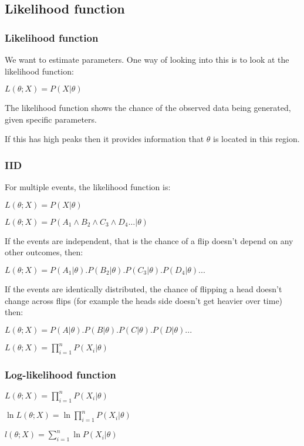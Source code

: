 
\subsection{Likelihood function}

\subsubsection{Likelihood function}

We want to estimate parameters. One way of looking into this is to look at the likelihood function:

\(L(\theta ; X)=P(X|\theta )\)

The likelihood function shows the chance of the observed data being generated, given specific parameters.

If this has high peaks then it provides information that \(\theta \) is located in this region.

\subsubsection{IID}

For multiple events, the likelihood function is:

\(L(\theta ; X)=P(X|\theta )\)

\(L(\theta ; X)=P(A_1 \land B_2 \land C_3 \land D_4…|\theta )\)

If the events are independent, that is the chance of a flip doesn’t depend on any other outcomes, then:

\(L(\theta ; X)=P(A_1|\theta ).P(B_2|\theta ).P(C_3|\theta ).P(D_4|\theta )...\)

If the events are identically distributed, the chance of flipping a head doesn’t change across flips (for example the heads side doesn’t get heavier over time) then:

\(L(\theta ; X)=P(A|\theta ).P(B|\theta ).P(C|\theta ).P(D|\theta )...\)

\(L(\theta ; X)=\prod_{i=1}^n P(X_i|\theta )\)

\subsubsection{Log-likelihood function}

\(L(\theta ; X)=\prod_{i=1}^n P(X_i|\theta )\)

\(\ln L(\theta ; X)=\ln \prod_{i=1}^n P(X_i|\theta )\)

\(l(\theta ; X)=\sum_{i=1}^n \ln P(X_i|\theta )\)

